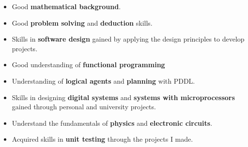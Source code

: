 
\begin{itemize}

\item Good \textbf{mathematical background}.

\item Good \textbf{problem solving} and \textbf{deduction} skills.

\item Skills in \textbf{software design} gained by applying the design principles to develop projects.

\item Good understanding of \textbf{functional programming}

\item Understanding of \textbf{logical agents} and \textbf{planning} with PDDL.

\item Skills in designing \textbf{digital systems} and \textbf{systems with microprocessors} gained through personal and university projects.

\item Understand the fundamentals of \textbf{physics} and \textbf{electronic circuits}.

\item Acquired skills in \textbf{unit testing} through the projects I made.

\end{itemize} 
